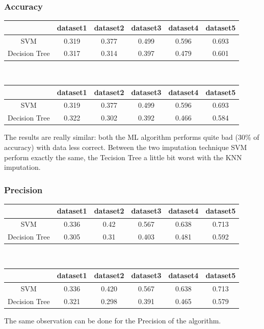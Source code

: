 \documentclass{article}
\begin{document}
\subsubsection*{Accuracy}
\begin{table}[h]
\begin{tabular}{|c|c|c|c|c|c|}
\hline
 & dataset1 & dataset2 & dataset3 & dataset4 & dataset5 \\ \hline
SVM & 0.319 & 0.377 & 0.499 & 0.596 & 0.693 \\ \hline
Decision Tree & 0.317 & 0.314 & 0.397 & 0.479 & 0.601 \\ \hline
\end{tabular}\\
\begin{tabular}{|c|c|c|c|c|c|}
\hline
 & dataset1 & dataset2 & dataset3 & dataset4 & dataset5 \\ \hline
SVM & 0.319 & 0.377 & 0.499 & 0.596 & 0.693 \\ \hline
Decision Tree & 0.322 & 0.302 & 0.392 & 0.466 & 0.584 \\ \hline
\end{tabular}
\end{table}The results are really similar: both the ML algorithm performs quite bad (30\% of accuracy) with data less correct. Between the two imputation technique SVM perform exactly the same, the Tecision Tree a little bit worst with the KNN imputation.
\subsubsection*{Precision}
\begin{table}[H]
\begin{tabular}{|c|c|c|c|c|c|}
\hline
 & dataset1 & dataset2 & dataset3 & dataset4 & dataset5 \\ \hline
SVM & 0.336 & 0.42 & 0.567 & 0.638 & 0.713 \\ \hline
Decision Tree & 0.305 & 0.31 & 0.403 & 0.481 & 0.592 \\ \hline
\end{tabular}\\
\begin{tabular}{|c|c|c|c|c|c|}
\hline
 & dataset1 & dataset2 & dataset3 & dataset4 & dataset5 \\ \hline
SVM & 0.336 & 0.420 & 0.567 & 0.638 & 0.713 \\ \hline
Decision Tree & 0.321 & 0.298 & 0.391 & 0.465 & 0.579 \\ \hline
\end{tabular}
\end{table}
The same observation can be done for the Precision of the algorithm.
\end{document}
